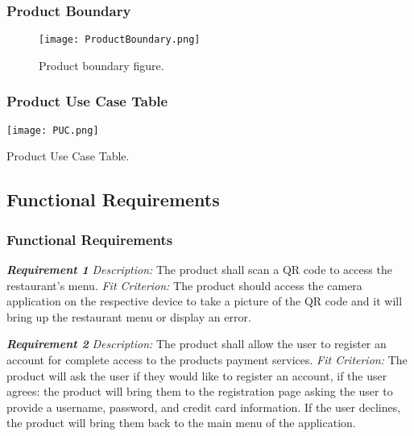\documentclass[12pt, titlepage]{article}
\begin{document}
\subsubsection{Product Boundary}
\begin{figure}[H]
\texttt{[image: ProductBoundary.png]}
\caption{Product boundary figure.}
\end{figure}

\subsubsection{Product Use Case Table}
\begin{table}[H]
  \centering
\texttt{[image: PUC.png]}
\caption{Product Use Case Table.}
\end{table}
\subsection{Functional Requirements}
\subsubsection{Functional Requirements}

\textbf{\textit{Requirement 1}}\newline
\textit{Description:}\newline
The product shall scan a QR code to access the restaurant's menu.\newline\newline
\textit{Fit Criterion:}\newline 
The product should access the camera application on the respective device to take a picture of the QR code and it will bring up the restaurant menu or display an error.
\newline

\noindent\textbf{\textit{Requirement 2}}\newline
\textit{Description:}\newline
The product shall allow the user to register an account for complete access to the products payment services. \newline\newline
\textit{Fit Criterion:}\newline 
The product will ask the user if they would like to register an account, if the user agrees: the product will bring them to the registration page asking the user to provide a username, password, and credit card information. If the user declines, the product will bring them back to the main menu of the application.
\newline
\end{document}
